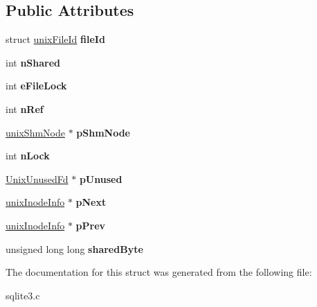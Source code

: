 \subsection*{Public Attributes}
\begin{DoxyCompactItemize}
\item 
\hypertarget{structunix_inode_info_ae692731d449f4462a921dda9a061faa6}{struct \hyperlink{structunix_file_id}{unix\-File\-Id} {\bfseries file\-Id}}\label{structunix_inode_info_ae692731d449f4462a921dda9a061faa6}

\item 
\hypertarget{structunix_inode_info_a0d7f8dd92964f53e59c8d741dbe00a61}{int {\bfseries n\-Shared}}\label{structunix_inode_info_a0d7f8dd92964f53e59c8d741dbe00a61}

\item 
\hypertarget{structunix_inode_info_a615196e91c97d2ebb0e41b54aeb7e59e}{int {\bfseries e\-File\-Lock}}\label{structunix_inode_info_a615196e91c97d2ebb0e41b54aeb7e59e}

\item 
\hypertarget{structunix_inode_info_a65cbd1fd05ed00f03a252266b04a8221}{int {\bfseries n\-Ref}}\label{structunix_inode_info_a65cbd1fd05ed00f03a252266b04a8221}

\item 
\hypertarget{structunix_inode_info_a302a8b82e27d5b3624ec122bc9c2ed61}{\hyperlink{structunix_shm_node}{unix\-Shm\-Node} $\ast$ {\bfseries p\-Shm\-Node}}\label{structunix_inode_info_a302a8b82e27d5b3624ec122bc9c2ed61}

\item 
\hypertarget{structunix_inode_info_a477f3357a32adbc1a9b05017e535444d}{int {\bfseries n\-Lock}}\label{structunix_inode_info_a477f3357a32adbc1a9b05017e535444d}

\item 
\hypertarget{structunix_inode_info_a0dda9ad35734fa161d1f0b13b671c1c6}{\hyperlink{struct_unix_unused_fd}{Unix\-Unused\-Fd} $\ast$ {\bfseries p\-Unused}}\label{structunix_inode_info_a0dda9ad35734fa161d1f0b13b671c1c6}

\item 
\hypertarget{structunix_inode_info_a80181ba4ef71dd0d8e55e97baedc761e}{\hyperlink{structunix_inode_info}{unix\-Inode\-Info} $\ast$ {\bfseries p\-Next}}\label{structunix_inode_info_a80181ba4ef71dd0d8e55e97baedc761e}

\item 
\hypertarget{structunix_inode_info_a6575edce9898b48870c6f48047c01d01}{\hyperlink{structunix_inode_info}{unix\-Inode\-Info} $\ast$ {\bfseries p\-Prev}}\label{structunix_inode_info_a6575edce9898b48870c6f48047c01d01}

\item 
\hypertarget{structunix_inode_info_ab71436b34e8e12e6d192f611a6786270}{unsigned long long {\bfseries shared\-Byte}}\label{structunix_inode_info_ab71436b34e8e12e6d192f611a6786270}

\end{DoxyCompactItemize}


The documentation for this struct was generated from the following file\-:\begin{DoxyCompactItemize}
\item 
sqlite3.\-c\end{DoxyCompactItemize}
